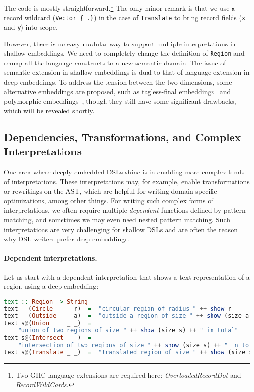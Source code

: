 \noindent
The code is mostly straightforward.\footnote{Two GHC language extensions are
required here: \emph{OverloadedRecordDot} and \emph{RecordWildCards}.} The only
minor remark is that we use a record wildcard (\lstinline|Vector {..}|) in the
case of \lstinline{Translate} to bring record fields (\lstinline{x} and
\lstinline{y}) into scope.

However, there is no easy modular way to support multiple interpretations in
shallow embeddings. We need to completely change the definition of
\lstinline{Region} and remap all the language constructs to a new semantic
domain. The issue of semantic extension in shallow embeddings is dual to that of
language extension in deep embeddings. To address the tension between the two
dimensions, some alternative embeddings are proposed, such as tagless-final
embeddings~\citep{carette2009finally,kiselyov2010typed} and polymorphic
embeddings~\citep{hofer2008polymorphic}, though they still have some significant
drawbacks, which will be revealed shortly.

\subsection{Dependencies, Transformations, and Complex Interpretations} \label{sec:transform}

One area where deeply embedded DSLs shine is in enabling more complex kinds of
interpretations. These interpretations may, for example, enable transformations
or rewritings on the AST, which are helpful for writing domain-specific
optimizations, among other things. For writing such complex forms of
interpretations, we often require multiple \emph{dependent} functions defined by
pattern matching, and sometimes we may even need nested pattern matching. Such
interpretations are very challenging for shallow DSLs and are often the reason
why DSL writers prefer deep embeddings.

\paragraph{Dependent interpretations.}
Let us start with a dependent interpretation that shows a text representation of
a region using a deep embedding:

\begin{lstlisting}[language=Haskell]
text :: Region -> String
text   (Circle      r)  =  "circular region of radius " ++ show r
text   (Outside     a)  =  "outside a region of size " ++ show (size a)
text s@(Union     _ _)  =
    "union of two regions of size " ++ show (size s) ++ " in total"
text s@(Intersect _ _)  =
    "intersection of two regions of size " ++ show (size s) ++ " in total"
text s@(Translate _ _)  =  "translated region of size " ++ show (size s)
\end{lstlisting}

